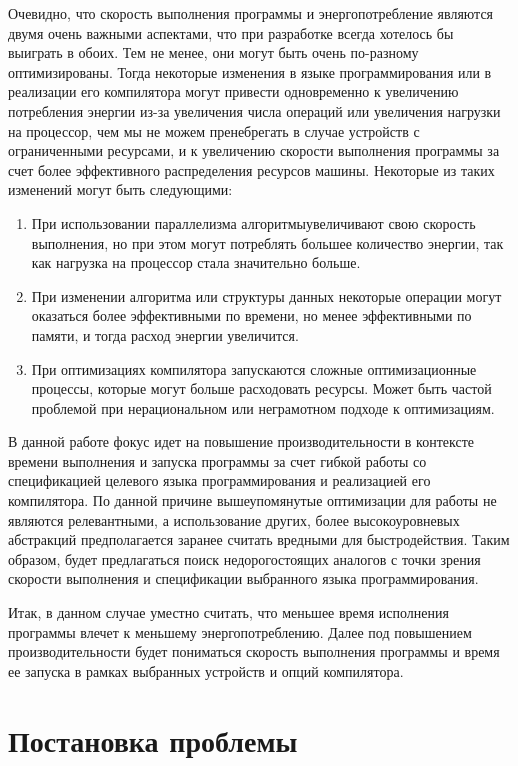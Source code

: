 \documentclass{mipt-thesis-bs}
\begin{document}
Очевидно, что скорость выполнения программы и энергопотребление являются двумя очень важными
аспектами, что при разработке всегда хотелось бы выиграть в обоих. Тем не менее, они могут
быть очень по-разному оптимизированы. Тогда некоторые изменения в языке программирования или
в реализации его компилятора могут привести одновременно к увеличению потребления энергии из-за
увеличения числа операций или увеличения нагрузки на процессор, чем мы
не можем пренебрегать в случае устройств с ограниченными ресурсами, и к увеличению скорости выполнения
программы за счет более эффективного распределения ресурсов машины. Некоторые из таких
изменений могут быть следующими:

\begin{enumerate}
    \item При использовании параллелизма алгоритмыувеличивают свою скорость выполнения, но при этом
    могут потреблять большее количество энергии, так как нагрузка на процессор стала
    значительно больше.
    \item При изменении алгоритма или структуры данных некоторые операции могут оказаться
    более эффективными по времени, но менее эффективными по памяти, и тогда расход
    энергии увеличится.
    \item При оптимизациях компилятора запускаются сложные оптимизационные процессы, которые
    могут больше расходовать ресурсы. Может быть частой проблемой при нерациональном или
    неграмотном подходе к оптимизациям.
\end{enumerate}

В данной работе фокус идет на повышение производительности в контексте времени выполнения и
запуска программы за счет гибкой работы со спецификацией целевого языка программирования и
реализацией его компилятора. По данной причине вышеупомянутые оптимизации для работы не являются
релевантными, а использование других, более высокоуровневых абстракций предполагается заранее считать
вредными для быстродействия. Таким образом, будет предлагаться поиск недорогостоящих аналогов
с точки зрения скорости выполнения и спецификации выбранного языка программирования.

Итак, в данном случае уместно считать, что меньшее время исполнения программы
влечет к меньшему энергопотреблению. Далее под повышением производительности будет пониматься скорость выполнения
программы и время ее запуска в рамках выбранных устройств и опций компилятора.



\chapter{Постановка проблемы}
\end{document}

